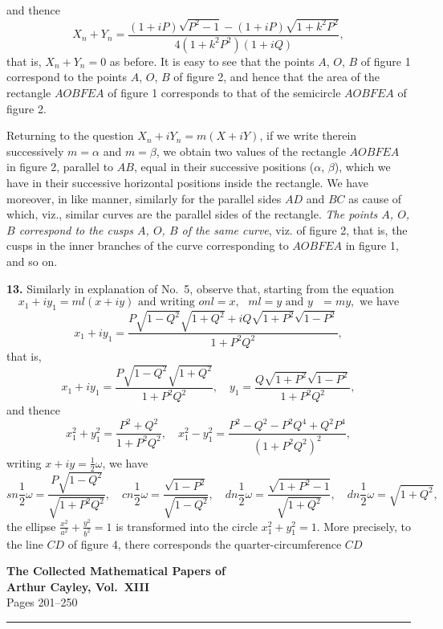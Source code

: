 \documentclass[11pt,a4paper]{book}
\begin{document}
and thence
\[
X_n + Y_n = \frac{(1 + i P)\sqrt{P^2 - 1} - (1 + i P)\sqrt{1 + k^2 P^2}}{4(1 + k^2 P^2)(1 + i Q)},
\]
that is, $X_n + Y_n = 0$ as before. It is easy to see that the points $A$, $O$, $B$ of figure 1 correspond to the points $A$, $O$, $B$ of figure 2, and hence that the area of the rectangle $AOBFEA$ of figure 1 corresponds to that of the semicircle $AOBFEA$ of figure 2.

Returning to the question $X_n + iY_n = m (X + iY)$, if we write therein successively $m = \alpha$ and $m = \beta$, we obtain two values of the rectangle $AOBFEA$ in figure 2, parallel to $AB$, equal in their successive positions ($\alpha$, $\beta$), which we have in their successive horizontal positions inside the rectangle. We have moreover, in like manner, similarly for the parallel sides $AD$ and $BC$ as cause of which, viz., similar curves are the parallel sides of the rectangle. \textit{The points $A$, $O$, $B$ correspond to the cusps $A$, $O$, $B$ of the same curve}, viz. of figure 2, that is, the cusps in the inner branches of the curve corresponding to $AOBFEA$ in figure 1, and so on.

\textbf{13.} Similarly in explanation of No.\ 5, observe that, starting from the equation
\[
x_1 + i y_1 = ml (x + iy) \text{ and writing } onl = x, \text{ } ml = y \text{ and } y \text{ } = m y, \text{ we have}
\]
\[
x_1 + iy_1 = \frac{P\sqrt{1 - Q^2}\sqrt{1 + Q^2} + iQ\sqrt{1 + P^2}\sqrt{1 - P^2}}{1 + P^2 Q^2},
\]
that is,
\[
x_1 + iy_1 = \frac{P\sqrt{1 - Q^2}\sqrt{1 + Q^2}}{1 + P^2 Q^2}, \quad y_1 = \frac{Q\sqrt{1 + P^2}\sqrt{1 - P^2}}{1 + P^2 Q^2},
\]
and thence
\[
x_1^2 + y_1^2 = \frac{P^2 + Q^2}{1 + P^2 Q^2}, \quad x_1^2 - y_1^2 = \frac{P^2 - Q^2 - P^2 Q^4 + Q^2 P^4}{(1 + P^2 Q^2)^2},
\]
writing $x + iy = \frac{1}{2}\omega$, we have
\[
sn \frac{1}{2}\omega = \frac{P\sqrt{1 - Q^2}}{\sqrt{1 + P^2 Q^2}}, \quad cn \frac{1}{2}\omega = \frac{\sqrt{1 - P^2}}{\sqrt{1 - Q^2}}, \quad dn \frac{1}{2}\omega = \frac{\sqrt{1 + P^2 - 1}}{\sqrt{1 + Q^2}}, \quad dn \frac{1}{2}\omega = \sqrt{1 + Q^2},
\]
the ellipse $\frac{x^2}{a^2} + \frac{y^2}{b^2} = 1$ is transformed into the circle $x_1^2 + y_1^2 = 1$. More precisely, to the line $CD$ of figure 4, there corresponds the quarter-circumference $CD$
\clearpage


\begin{center}
{\Large\bfseries The Collected Mathematical Papers of\\[4pt]
Arthur Cayley, Vol.~XIII}\\[12pt]
{\large Pages 201--250}\\[8pt]
\rule{\textwidth}{0.4pt}
\end{center}
\end{document}
